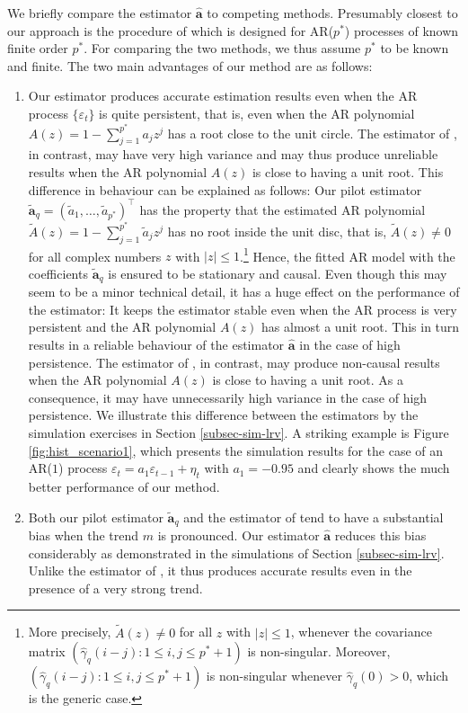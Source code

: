 We briefly compare the estimator $\widehat{\boldsymbol{a}}$ to competing methods. Presumably closest to our approach is the procedure of \cite{Hall2003} which is designed for AR($p^*$) processes of known finite order $p^*$. For comparing the two methods, we thus assume $p^*$ to be known and finite. The two main advantages of our method are as follows: 
\begin{enumerate}[label=(\alph*),leftmargin=0.7cm]
\item Our estimator produces accurate estimation results even when the AR process $\{\varepsilon_t\}$ is quite persistent, that is, even when the AR polynomial $A(z) = 1 - \sum_{j=1}^{p^*} a_j z^j$ has a root close to the unit circle. The estimator of \cite{Hall2003}, in contrast, may have very high variance and may thus produce unreliable results when the AR polynomial $A(z)$ is close to having a unit root. This difference in behaviour can be explained as follows: Our pilot estimator $\widetilde{\boldsymbol{a}}_q = (\widetilde{a}_1,\ldots,\widetilde{a}_{p^*})^\top$ has the property that the estimated AR polynomial $\widetilde{A}(z) = 1 - \sum_{j=1}^{p^*} \widetilde{a}_j z^j$ has no root inside the unit disc, that is, $\widetilde{A}(z) \ne 0$ for all complex numbers $z$ with $|z| \le 1$.\footnote{More precisely, $\widetilde{A}(z) \ne 0$ for all $z$ with $|z| \le 1$, whenever the covariance matrix $(\widehat{\gamma}_q(i-j): 1 \le i,j \le p^*+1)$ is non-singular. Moreover, $(\widehat{\gamma}_q(i-j): 1 \le i,j \le p^*+1)$ is non-singular whenever $\widehat{\gamma}_q(0) > 0$, which is the generic case.} Hence, the fitted AR model with the coefficients $\widetilde{\boldsymbol{a}}_q$ is ensured to be stationary and causal. Even though this may seem to be a minor technical detail, it has a huge effect on the performance of the estimator: It keeps the estimator stable even when the AR process is very persistent and the AR polynomial $A(z)$ has almost a unit root. This in turn results in a reliable behaviour of the estimator $\widehat{\boldsymbol{a}}$ in the case of high persistence. The estimator of \cite{Hall2003}, in contrast, may produce non-causal results when the AR polynomial $A(z)$ is close to having a unit root. As a consequence, it may have unnecessarily high variance in the case of high persistence. We illustrate this difference between the estimators by the simulation exercises in Section \ref{subsec-sim-lrv}. A striking example is Figure \ref{fig:hist_scenario1}, which presents the simulation results for the case of an AR($1$) process $\varepsilon_t = a_1 \varepsilon_{t-1} + \eta_t$ with $a_1 = -0.95$ and clearly shows the much better performance of our method.  
\item Both our pilot estimator $\widetilde{\boldsymbol{a}}_q$ and the estimator of \cite{Hall2003} tend to have a substantial bias when the trend $m$ is pronounced. Our estimator $\widehat{\boldsymbol{a}}$ reduces this bias considerably as demonstrated in the simulations of Section \ref{subsec-sim-lrv}. Unlike the estimator of \cite{Hall2003}, it thus produces accurate results even in the presence of a very strong trend. 
\end{enumerate}



